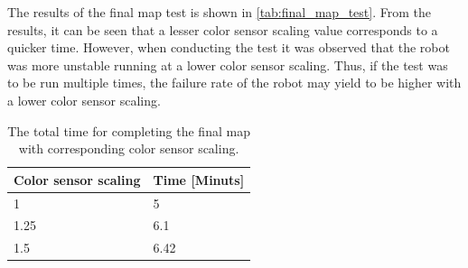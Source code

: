 \documentclass[../report.tex]{subfiles}
\begin{document}
\begin{table}[H]
\centering
{}
\caption{Results for all the turning tests and the intersection test.}
\label{tab:turn_test}
\end{table} 

The results of the final map test is shown in \autoref{tab:final_map_test}. From the results, it can be seen that a lesser color sensor scaling value corresponds to a quicker time. However, when conducting the test it was observed that the robot was more unstable running at a lower color sensor scaling. Thus, if the test was to be run multiple times, the failure rate of the robot may yield to be higher with a lower color sensor scaling. 

\begin{table}[H]
\centering
\begin{tabular}{l|l}
\toprule
\textbf{Color sensor scaling} & \textbf{Time {[}Minuts{]}} \\ \hline
1 & 5 \\
1.25 & 6.1 \\
1.5 & 6.42 \\ \bottomrule
\end{tabular}
\caption{The total time for completing the final map with corresponding color sensor scaling.}
\label{tab:final_map_test}
\end{table}
\end{document}
